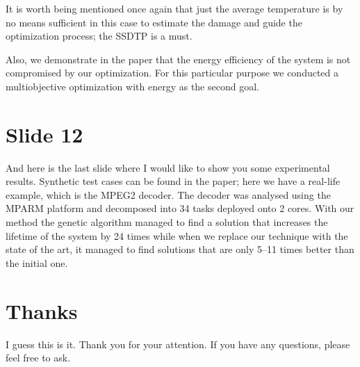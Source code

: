 \documentclass[11pt,a4paper]{article}
\begin{document}
It is worth being mentioned once again that just the average temperature is by no means sufficient in this case to estimate the damage and guide the optimization process; the SSDTP is a must.

Also, we demonstrate in the paper that the energy efficiency of the system is not compromised by our optimization. For this particular purpose we conducted a multiobjective optimization with energy as the second goal.

\section{Slide 12}
And here is the last slide where I would like to show you some experimental results. Synthetic test cases can be found in the paper; here we have a real-life example, which is the MPEG2 decoder. The decoder was analysed using the MPARM platform and decomposed into 34 tasks deployed onto 2 cores. With our method the genetic algorithm managed to find a solution that increases the lifetime of the system by 24 times while when we replace our technique with the state of the art, it managed to find solutions that are only 5--11 times better than the initial one.

\section{Thanks}
I guess this is it. Thank you for your attention. If you have any questions, please feel free to ask.
\end{document}
